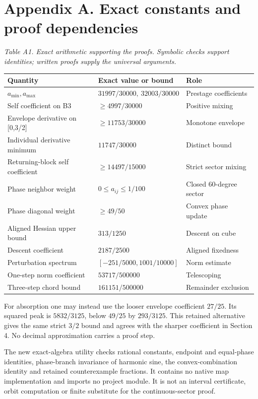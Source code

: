\documentclass[11pt,a4paper]{article}
\begin{document}
\clearpage
\section*{Appendix A. Exact constants and proof dependencies}
\par\textit{Table A1. Exact arithmetic supporting the proofs. Symbolic checks support identities; written proofs supply the universal arguments.}\par
\begingroup\small
\begin{tabularx}{\textwidth}{XXX}
\toprule
Quantity & Exact value or bound & Role\\\midrule
$a_{\min},a_{\max}$ & $31997/30000,\ 32003/30000$ & Prestage coefficients\\
Self coefficient on B3 & $\geq4997/30000$ & Positive mixing\\
Envelope derivative on [0,3/2] & $\geq11753/30000$ & Monotone envelope\\
Individual derivative minimum & $11747/30000$ & Distinct bound\\
Returning-block self coefficient & $\geq14497/15000$ & Strict sector mixing\\
Phase neighbor weight & $0\leq a_{ij}\leq1/100$ & Closed 60-degree sector\\
Phase diagonal weight & $\geq49/50$ & Convex phase update\\
Aligned Hessian upper bound & $313/1250$ & Descent on cube\\
Descent coefficient & $2187/2500$ & Aligned fixedness\\
Perturbation spectrum & $[-251/5000,1001/10000]$ & Norm estimate\\
One-step norm coefficient & $53717/500000$ & Telescoping\\
Three-step chord bound & $161151/500000$ & Remainder exclusion\\
\bottomrule\end{tabularx}\endgroup\par
For absorption one may instead use the looser envelope coefficient $27/25$. Its squared peak is $5832/3125$, below $49/25$ by $293/3125$. This retained alternative gives the same strict $3/2$ bound and agrees with the sharper coefficient in Section 4. No decimal approximation carries a proof step.

The new exact-algebra utility checks rational constants, endpoint and equal-phase identities, phase-branch invariance of harmonic sine, the convex-combination identity and retained counterexample fractions. It contains no native map implementation and imports no project module. It is not an interval certificate, orbit computation or finite substitute for the continuous-sector proof.
\end{document}
